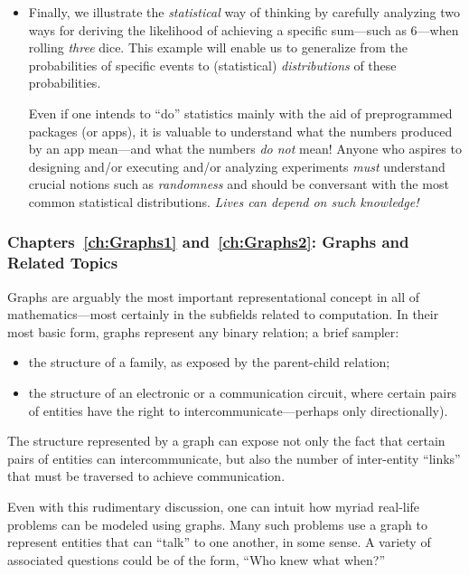 \begin{itemize}
\medskip\item
Finally, we illustrate the {\em statistical} way of thinking by carefully analyzing two ways for deriving the likelihood of achieving a specific sum---such as $6$---when rolling {\em three} dice.  This example will enable us to generalize from the probabilities of specific events to (statistical) {\it distributions} of these probabilities.

\smallskip

Even if one intends to ``do'' statistics mainly with the aid of preprogrammed packages (or apps), it is valuable to understand what the numbers produced by an app mean---and what the numbers {\em do not} mean!   Anyone who aspires to designing and/or executing and/or analyzing experiments {\em must} understand crucial notions such as {\em randomness} and should be conversant with the most common statistical distributions.  {\em Lives can depend on such knowledge!}
\end{itemize}

\subsubsection{Chapters~\ref{ch:Graphs1} and~\ref{ch:Graphs2}: Graphs and Related Topics}

Graphs are arguably the most important representational concept in all of mathematics---most certainly in the subfields related to computation.  In their most basic form, graphs represent any binary relation; a brief sampler:
\begin{itemize}
\item
the structure of a family, as exposed by the parent-child relation;
\medskip\item
the structure of an electronic or a communication circuit, where certain pairs of entities have the right to intercommunicate---perhaps only directionally).
\end{itemize}
The structure represented by a graph can expose not only the fact that certain pairs of entities can intercommunicate, but also the number of inter-entity ``links'' that must be traversed to achieve communication.

Even with this rudimentary discussion, one can intuit how myriad real-life problems can be modeled using graphs.  Many such problems use a graph to represent entities that can ``talk'' to one another, in some sense.  A variety of associated questions could be of the form, ``Who knew what when?''

